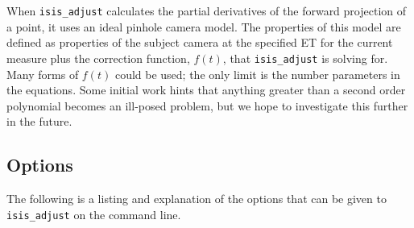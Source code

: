 When \texttt{isis\_adjust} calculates the partial derivatives of the
forward projection of a point, it uses an ideal pinhole camera model.
The properties of this model are defined as properties of the subject
camera at the specified ET for the current measure plus the
correction function, $f(t)$, that \texttt{isis\_adjust} is solving
for.  Many forms of $f(t)$ could be used; the only limit is the
number parameters in the equations. Some initial work hints that
anything greater than a second order polynomial becomes an ill-posed
problem, but we hope to investigate this further in the future.

\subsection{Options}

The following is a listing and explanation of the options
that can be given to \texttt{isis\_adjust} on the command line.

